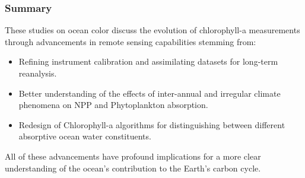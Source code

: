 \begin{frame}\frametitle{Summary} 

  \note[item] These studies on ocean color discuss the evolution of chlorophyll-a measurements through advancements in remote sensing capabilities stemming from:
  \begin{itemize}
    \item Refining instrument calibration and assimilating datasets for long-term reanalysis.
    \item Better understanding of the effects of inter-annual and irregular climate phenomena on NPP and Phytoplankton absorption.
    \item Redesign of Chlorophyll-a algorithms for distinguishing between different absorptive ocean water constituents. 
  \end{itemize}
  All of these advancements have profound implications for a more clear understanding of the ocean's contribution to the Earth's carbon cycle.
\end{frame}
